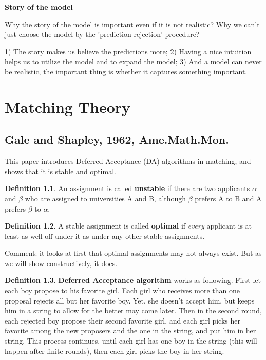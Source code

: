 \documentclass{book}
\theoremstyle{plain}
\theoremstyle{definition}
\newtheorem{defn}{Definition}[section] %
\begin{document}
\noindent
\textbf{Story of the model}

Why the story of the model is important even if it is not realistic? Why we can't just choose the model by the 'prediction-rejection' procedure?

1) The story makes us believe the predictions more;
2) Having a nice intuition helps us to utilize the model and to expand the model;
3) And a model can never be realistic, the important thing is whether it captures something important.




\chapter{Matching Theory} %
\label{cha:matching_theory}

\section{Gale and Shapley, 1962, Ame.Math.Mon.} %
\label{sec:gale_and_shapley_1962}

\textbf{}

This paper introduces Deferred Acceptance (DA) algorithms in matching, and shows that it is stable and optimal.

\begin{defn}
An assignment is called \textbf{unstable} if there are two applicants $\alpha$ and $\beta$ who are assigned to universities A and B, although $\beta$ prefers A to B and A prefers $\beta$ to $\alpha$.
\end{defn}

\begin{defn}
A stable assignment is called \textbf{optimal} if \textit{every} applicant is at least as well off under it as under any other stable assignments.
\end{defn}

Comment: it looks at first that optimal assignments may not always exist. But as we will show constructively, it does.

\begin{defn}
\textbf{Deferred Acceptance algorithm} works as following. First let each boy propose to his favorite girl. Each girl who receives more than one proposal rejects all but her favorite boy. Yet, she doesn't accept him, but keeps him in a string to allow for the better may come later. Then in the second round, each rejected boy propose their second favorite girl, and each girl picks her favorite among the new proposers and the one in the string, and put him in her string. This process continues, until each girl has one boy in the string (this will happen after finite rounds), then each girl picks the boy in her string.
\end{defn}
\end{document}
